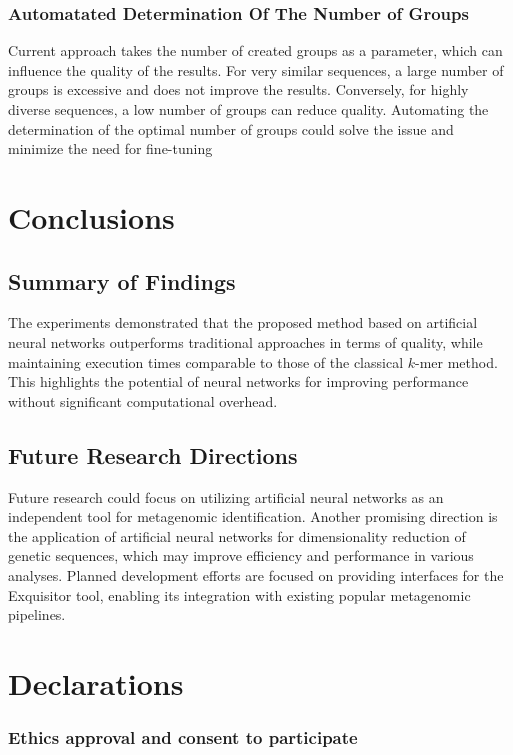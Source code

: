 \documentclass[pdflatex,sn-vancouver-num]{sn-jnl}%
\begin{document}
            \subsubsection{Automatated Determination Of The Number of Groups}
                Current approach takes the number of created groups as a parameter, which can influence the quality of the results. For very similar sequences, a large number of groups is excessive and does not improve the results. Conversely, for highly diverse sequences, a low number of groups can reduce quality. Automating the determination of the optimal number of groups could solve the issue and minimize the need for fine-tuning

    \section{Conclusions}
        \subsection{Summary of Findings}
            The experiments demonstrated that the proposed method based on artificial neural networks outperforms traditional approaches in terms of quality, while maintaining execution times comparable to those of the classical $k$-mer method. This highlights the potential of neural networks for improving performance without significant computational overhead.

        \subsection{Future Research Directions}
        Future research could focus on utilizing artificial neural networks as an independent tool for metagenomic identification. Another promising direction is the application of artificial neural networks for dimensionality reduction of genetic sequences, which may improve efficiency and performance in various analyses. Planned development efforts are focused on providing interfaces for the Exquisitor tool, enabling its integration with existing popular metagenomic pipelines.

\section{Declarations}

\subsubsection*{Ethics approval and consent to participate}
\end{document}
